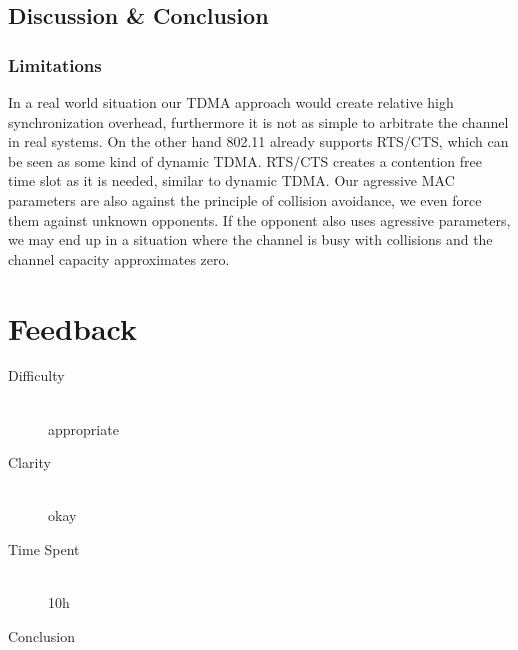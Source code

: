 \documentclass[12pt]{article}
\begin{document}
\subsection{Discussion \& Conclusion}

\subsubsection{Limitations}
In a real world situation our TDMA approach would create relative high synchronization overhead, furthermore it is not as simple to arbitrate the channel in real systems. On the other hand 802.11 already supports RTS/CTS, which can be seen as some kind of dynamic TDMA. RTS/CTS creates a contention free time slot as it is needed, similar to dynamic TDMA. Our agressive MAC parameters are also against the principle of collision avoidance, we even force them against unknown opponents. If the opponent also uses agressive parameters, we may end up in a situation where the channel is busy with collisions and the channel capacity approximates zero.

\section{Feedback}

\begin{description}
  \item[Difficulty] \hfill \\ appropriate
  \item[Clarity] \hfill \\ okay
  \item[Time Spent] \hfill \\ 10h
  \item[Conclusion] \hfill \\ 
\end{description}
\end{document}
